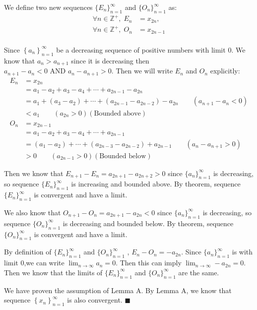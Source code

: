 \documentclass[12pt]{exam}
\newcommand {\DS} [1] {${\displaystyle #1}$}
\newcommand{\Z}{\mathbb{Z}}
\begin{document}
\begin{enumerate}
We define two new sequences $\{E_n\}_{n=1}^{\infty}$ and $\{O_n\}_{n=1}^{\infty}$ as:
\begin{align*}
	\forall n \in \Z^+, \; E_n&=x_{2n}, \\
	\forall n \in \Z^+, \; O_n&=x_{2n-1} \\
\end{align*}

Since \DS{\left\{a_n\right\}_{n=1}^{\infty}} be a decreasing sequence of positive numbers with limit $0$. We know that $a_n>a_{n+1}$ since it is decreasing then $a_{n+1}-a_{n}<0\mbox{ AND }a_{n}-a_{n+1}>0$. Then we will write $E_n$ and $O_n$ explicitly:
\begin{align*}
    E_n&=x_{2n}\\
    &=a_1-a_2+a_3-a_4+\cdots+a_{2n-1}-a_{2n}\\\
    &=a_1+(a_3-a_2)+\cdots+(a_{2n-1}-a_{2n-2})-a_{2n}\qquad(a_{n+1}-a_{n}<0)\\
    &<a_1 \qquad(a_{2n}>0)(\mbox{Bounded above})\\
    O_n&=x_{2n-1}\\
    &=a_1-a_2+a_3-a_4+\cdots+a_{2n-1}\\\
    &=(a_1-a_2)+\cdots+(a_{2n-3}-a_{2n-2})+a_{2n-1}\qquad(a_{n}-a_{n+1}>0)\\
    &>0 \qquad(a_{2n-1}>0)(\mbox{Bounded below})
\end{align*}

Then we know that $E_{n+1}-E_{n}=a_{2n+1}-a_{2n+2}>0$ since $\{a_n\}_{n=1}^{\infty}$ is decreasing, so sequence $\{E_n\}_{n=1}^{\infty}$ is increasing and bounded above. By theorem, sequence $\{E_n\}_{n=1}^{\infty}$ is convergent and have a limit.

We also know that $O_{n+1}-O_{n}=a_{2n+1}-a_{2n}<0$ since $\{a_n\}_{n=1}^{\infty}$ is decreasing, so sequence $\{O_n\}_{n=1}^{\infty}$ is decreasing and bounded below. By theorem, sequence $\{O_n\}_{n=1}^{\infty}$ is convergent and have a limit.

By definition of $\{E_n\}_{n=1}^{\infty}$ and $\{O_n\}_{n=1}^{\infty}$ , $E_n-O_n=-a_{2n}$. Since $\{a_n\}_{n=1}^{\infty}$ is with limit 0,we can write $\lim_{n\to\infty}a_n=0$. Then this can imply $\lim_{n\to\infty}-a_{2n}=0$. Then we know that the limits of $\{E_n\}_{n=1}^{\infty}$ and $\{O_n\}_{n=1}^{\infty}$ are the same.

We have proven the assumption of Lemma A. By Lemma A, we know that sequence \DS{\left\{x_n\right\}_{n=1}^{\infty}} is also convergent. \qquad$\blacksquare$


\end{enumerate}
\end{document}
